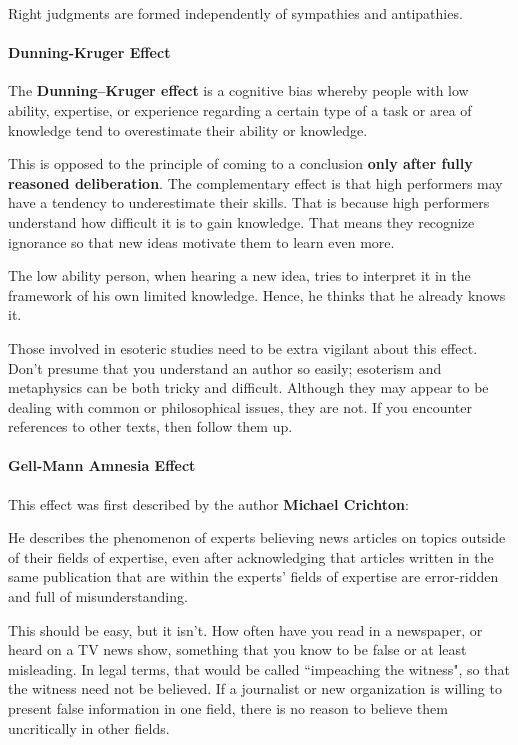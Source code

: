 Right judgments are formed independently of sympathies and antipathies.

\paragraph{Dunning-Kruger Effect}
\begin{quotex}
The \textbf{Dunning–Kruger effect} is a cognitive bias whereby people with low ability, expertise, or experience regarding a certain type of a task or area of knowledge tend to overestimate their ability or knowledge. 

\end{quotex}
This is opposed to the principle of coming to a conclusion \textbf{only after fully reasoned deliberation}. The complementary effect is that high performers may have a tendency to underestimate their skills. That is because high performers understand how difficult it is to gain knowledge. That means they recognize ignorance so that new ideas motivate them to learn even more.

The low ability person, when hearing a new idea, tries to interpret it in the framework of his own limited knowledge. Hence, he thinks that he already knows it.

Those involved in esoteric studies need to be extra vigilant about this effect. Don't presume that you understand an author so easily; esoterism and metaphysics can be both tricky and difficult. Although they may appear to be dealing with common or philosophical issues, they are not. If you encounter references to other texts, then follow them up.

\paragraph{Gell-Mann Amnesia Effect}
This effect was first described by the author \textbf{Michael Crichton}:

\begin{quotex}
He describes the phenomenon of experts believing news articles on topics outside of their fields of expertise, even after acknowledging that articles written in the same publication that are within the experts' fields of expertise are error-ridden and full of misunderstanding. 

\end{quotex}
This should be easy, but it isn't. How often have you read in a newspaper, or heard on a TV news show, something that you know to be false or at least misleading. In legal terms, that would be called ``impeaching the witness", so that the witness need not be believed. If a journalist or new organization is willing to present false information in one field, there is no reason to believe them uncritically in other fields.

